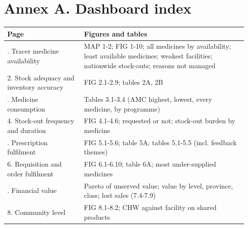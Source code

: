 \documentclass[10pt,a4paper]{article}
\begin{document}
\section{Annex A. Dashboard index}
{\footnotesize\setlength{\tabcolsep}{3pt}
\begin{longtable}{>{\raggedright\arraybackslash}p{0.317\linewidth}>{\raggedright\arraybackslash}p{0.663\linewidth}}
\rowcolor{navy}\textbf{\color{white}Page} & \textbf{\color{white}Figures and tables} \\
\endhead
1. Tracer medicine availability & MAP 1-2; FIG 1-10; all medicines by availability; least available medicines; weakest facilities; nationwide stock-outs; reasons not managed \\
\rowcolor{band}2. Stock adequacy and inventory accuracy & FIG 2.1-2.9; tables 2A, 2B \\
3. Medicine consumption & Tables 3.1-3.4 (AMC highest, lowest, every medicine, by programme) \\
\rowcolor{band}4. Stock-out frequency and duration & FIG 4.1-4.6; requested or not; stock-out burden by medicine \\
5. Prescription fulfilment & FIG 5.1-5.6; table 5A; tables 5.1-5.5 (incl. feedback themes) \\
\rowcolor{band}6. Requisition and order fulfilment & FIG 6.1-6.10; table 6A; most under-supplied medicines \\
7. Financial value & Pareto of unserved value; value by level, province, class; lost sales (7.4-7.9) \\
\rowcolor{band}8. Community level & FIG 8.1-8.2; CHW against facility on shared products \\
\end{longtable}}
\end{document}
